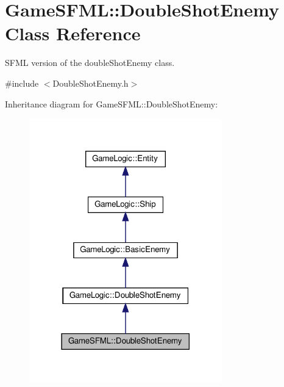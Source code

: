 \hypertarget{classGameSFML_1_1DoubleShotEnemy}{}\section{Game\+S\+F\+ML\+:\+:Double\+Shot\+Enemy Class Reference}
\label{classGameSFML_1_1DoubleShotEnemy}


S\+F\+ML version of the double\+Shot\+Enemy class.  




{\ttfamily \#include $<$Double\+Shot\+Enemy.\+h$>$}



Inheritance diagram for Game\+S\+F\+ML\+:\+:Double\+Shot\+Enemy\+:\nopagebreak
\begin{figure}[H]
\begin{center}
\leavevmode
\includegraphics[width=237pt]{classGameSFML_1_1DoubleShotEnemy__inherit__graph}
\end{center}
\end{figure}


